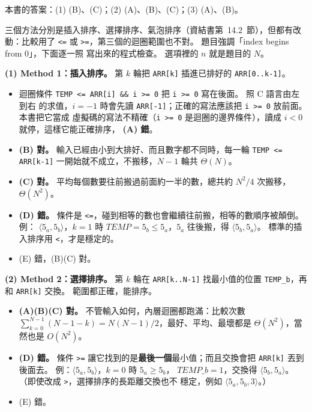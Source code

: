 \begin{pastsoln}
本書的答案：(1) (B)、(C)；(2) (A)、(B)、(C)；(3) (A)、(B)。

三個方法分別是插入排序、選擇排序、氣泡排序（資結書第~14.2~節），但都有改動：比較用了
\texttt{<=} 或 \texttt{>=}，第三個的迴圈範圍也不對。 題目強調「index begins from 0」，下面逐一照
寫出來的程式檢查。 選項裡的 $n$ 就是題目的 $N$。

\textbf{(1) Method 1：插入排序。} 第 $k$ 輪把 \texttt{ARR[k]} 插進已排好的 \texttt{ARR[0..k-1]}。
\begin{itemize}
\item 迴圈條件 \texttt{TEMP <= ARR[i] \&\& i >= 0} 把 \texttt{i >= 0} 寫在後面。 照 C 語言由左到右
的求值，$i = -1$ 時會先讀 \texttt{ARR[-1]}；正確的寫法應該把 \texttt{i >= 0} 放前面。 本書把它當成
虛擬碼的寫法不精確（\texttt{i >= 0} 是迴圈的邊界條件），讀成 $i < 0$ 就停，這樣它能正確排序，
\textbf{(A) 錯}。
\item \textbf{(B) 對。} 輸入已經由小到大排好、而且數字都不同時，每一輪 \texttt{TEMP <= ARR[k-1]}
一開始就不成立，不搬移，$N - 1$ 輪共 $\Theta(N)$。
\item \textbf{(C) 對。} 平均每個數要往前搬過前面約一半的數，總共約 $N^2/4$ 次搬移，$\Theta(N^2)$。
\item \textbf{(D) 錯。} 條件是 \texttt{<=}，碰到相等的數也會繼續往前搬，相等的數順序被顛倒。 例：
$\langle 5_a, 5_b\rangle$，$k = 1$ 時 $\mathit{TEMP} = 5_b \le 5_a$，$5_a$ 往後搬，得
$\langle 5_b, 5_a\rangle$。 標準的插入排序用 \texttt{<}，才是穩定的。
\item (E) 錯，(B)(C) 對。
\end{itemize}

\textbf{(2) Method 2：選擇排序。} 第 $k$ 輪在 \texttt{ARR[k..N-1]} 找最小值的位置
\texttt{TEMP\_b}，再和 \texttt{ARR[k]} 交換。 範圍都正確，能排序。
\begin{itemize}
\item \textbf{(A)(B)(C) 對。} 不管輸入如何，內層迴圈都跑滿：比較次數
$\sum_{k=0}^{N-1} (N - 1 - k) = N(N - 1)/2$，最好、平均、最壞都是 $\Theta(N^2)$，當然也是 $O(N^2)$。
\item \textbf{(D) 錯。} 條件 \texttt{>=} 讓它找到的是\textbf{最後一個}最小值；而且交換會把
\texttt{ARR[k]} 丟到後面去。 例：$\langle 5_a, 5_b\rangle$，$k = 0$ 時 $5_a \ge 5_b$，
$\mathit{TEMP\_b} = 1$，交換得 $\langle 5_b, 5_a\rangle$。 （即使改成 \texttt{>}，選擇排序的長距離交換也不
穩定，例如 $\langle 5_a, 5_b, 3\rangle$。）
\item (E) 錯。
\end{itemize}


\end{pastsoln}
